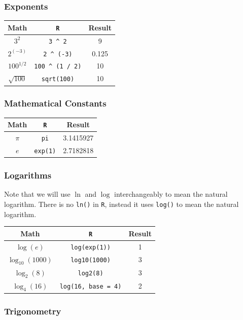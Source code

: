 \documentclass[]{book}
\theoremstyle{definition}
\theoremstyle{definition}
\theoremstyle{definition}
\theoremstyle{remark}
\begin{document}
\subsubsection*{Exponents}\label{exponents}

\begin{longtable}[]{@{}ccc@{}}
\toprule
Math & \texttt{R} & Result\tabularnewline
\midrule
\endhead
\(3^2\) & \texttt{3\ \^{}\ 2} & 9\tabularnewline
\(2^{(-3)}\) & \texttt{2\ \^{}\ (-3)} & 0.125\tabularnewline
\(100^{1/2}\) & \texttt{100\ \^{}\ (1\ /\ 2)} & 10\tabularnewline
\(\sqrt{100}\) & \texttt{sqrt(100)} & 10\tabularnewline
\bottomrule
\end{longtable}

\subsubsection*{Mathematical Constants}\label{mathematical-constants}

\begin{longtable}[]{@{}ccc@{}}
\toprule
Math & \texttt{R} & Result\tabularnewline
\midrule
\endhead
\(\pi\) & \texttt{pi} & 3.1415927\tabularnewline
\(e\) & \texttt{exp(1)} & 2.7182818\tabularnewline
\bottomrule
\end{longtable}

\subsubsection*{Logarithms}\label{logarithms}

Note that we will use \(\ln\) and \(\log\) interchangeably to mean the
natural logarithm. There is no \texttt{ln()} in \texttt{R}, instead it
uses \texttt{log()} to mean the natural logarithm.

\begin{longtable}[]{@{}ccc@{}}
\toprule
Math & \texttt{R} & Result\tabularnewline
\midrule
\endhead
\(\log(e)\) & \texttt{log(exp(1))} & 1\tabularnewline
\(\log_{10}(1000)\) & \texttt{log10(1000)} & 3\tabularnewline
\(\log_{2}(8)\) & \texttt{log2(8)} & 3\tabularnewline
\(\log_{4}(16)\) & \texttt{log(16,\ base\ =\ 4)} & 2\tabularnewline
\bottomrule
\end{longtable}

\subsubsection*{Trigonometry}\label{trigonometry}
\end{document}
